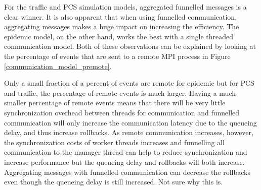 \documentclass[11pt]{book}
\begin{document}
For the traffic and PCS simulation models, aggregated funnelled messages is a clear winner.  It
is also apparent that when using funnelled communication, aggregating messages makes a huge
impact on increasing the efficiency.  The epidemic model, on the other hand, works the best with
a single threaded communication model.  Both of these observations can be explained by looking
at the percentage of events that are sent to a remote MPI process in Figure \ref{communication_model_premote}.

Only a small fraction of a percent of events are remote for epidemic but for PCS and traffic,
the percentage of remote events is much larger.  Having a much smaller percentage of remote
events means that there will be very little synchronization overhead between threads for communication
and funnelled communication will only increase the communication latency due to the queueing delay,
and thus increase rollbacks.  As remote communication increases, however, the synchronization costs
of worker threads increases and funnelling all communication to the manager thread can help to
reduce synchronization and increase performance but the queueing delay and rollbacks will both
increase.  Aggregating messages with funnelled communication can decrease the rollbacks even
though the queueing delay is still increased.  Not sure why this is.
\end{document}
